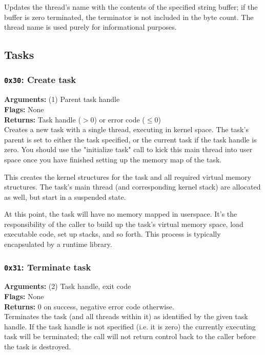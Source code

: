\documentclass[11pt]{article}
\begin{document}
Updates the thread's name with the contents of the specified string buffer; if the buffer is zero terminated, the terminator is not included in the byte count. The thread name is used purely for informational purposes. 


\newpage
\subsection{Tasks}
\subsubsection{{\tt 0x30}: Create task}
\textbf{Arguments:} (1) Parent task handle \\
\textbf{Flags:} None \\
\textbf{Returns:} Task handle ($>0$) or error code ($\leq0$) \\

Creates a new task with a single thread, executing in kernel space. The task's parent is set to either the task specified, or the current task if the task handle is zero. You should use the "initialize task" call to kick this main thread into user space once you have finished setting up the memory map of the task.

This creates the kernel structures for the task and all required virtual memory structures. The task's main thread (and corresponding kernel stack) are allocated as well, but start in a suspended state.

At this point, the task will have no memory mapped in userspace. It's the responsibility of the caller to build up the task's virtual memory space, load executable code, set up stacks, and so forth. This process is typically encapsulated by a runtime library.

\subsubsection{{\tt 0x31}: Terminate task}
\textbf{Arguments:} (2) Task handle, exit code \\
\textbf{Flags:} None \\
\textbf{Returns:} 0 on success, negative error code otherwise. \\

Terminates the task (and all threads within it) as identified by the given task handle. If the task handle is not specified (i.e. it is zero) the currently executing task will be terminated; the call will not return control back to the caller before the task is destroyed.
\end{document}
